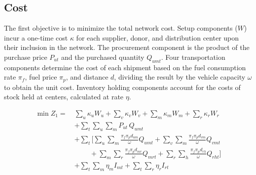 \documentclass[a4paper]{elsarticle}
\begin{document}
{\subsection{Cost}
The first objective is to minimize the total network cost. Setup components ($W$) incur a one-time cost $\kappa$ for each supplier, donor, and distribution center upon their inclusion in the network. The procurement component is the product of the purchase price $P_{ut}$ and the purchased quantity $Q_{umt}$. Four transportation components determine the cost of each shipment based on the fuel consumption rate $\pi_f$, fuel price $\pi_p$, and distance $d$, dividing the result by the vehicle capacity $\omega$ to obtain the unit cost. Inventory holding components account for the costs of stock held at centers, calculated at rate $\eta$.

\begin{equation}
\begin{aligned}
\min Z_1 =\
& \sum_{u}\kappa_u W_u + \sum_{v}\kappa_v W_v + \sum_{m}\kappa_m W_m + \sum_{r}\kappa_r W_r \\
& + \sum_{t}\sum_{u}\sum_{m} P_{ut}\, Q_{umt} \\
& + \sum_{t}\Bigg[ \sum_{u}\sum_{m}\frac{\pi_f \pi_p d_{um}}{\omega}Q_{umt}
  + \sum_{v}\sum_{m}\frac{\pi_f \pi_p d_{vm}}{\omega}Q_{vmt} \\
& \qquad\ + \sum_{m}\sum_{r}\frac{\pi_f \pi_p d_{mr}}{\omega}Q_{mrt}
  + \sum_{r}\sum_{h}\frac{\pi_f \pi_p d_{rh}}{\omega}Q_{rht} \Bigg] \\
& + \sum_{t}\sum_{m}\eta_m I_{mt} + \sum_{t}\sum_{r}\eta_r I_{rt}
\end{aligned}
\label{e4.1}
\end{equation}
}
\end{document}
